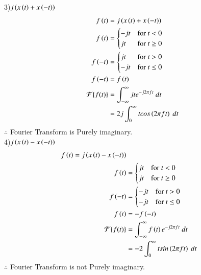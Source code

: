 \documentclass[journal,12pt,twocolumn]{IEEEtran}
\theoremstyle{remark}
\begin{document}
3)$j\left(x\left(t\right) + x\left(-t\right)\right)$
\begin{align}
  f\brak{t}&= j\brak{x\brak{t} + x\brak{-t}}\\
  f\brak{t} &= 
\begin{cases} 
-jt & \text{for } t < 0 \\
jt & \text{for } t \geq 0 
\end{cases}\\
   f\brak{-t} &= 
\begin{cases} 
jt & \text{for } t > 0 \\
-jt & \text{for } t \leq 0 
\end{cases}\\
  f\brak{-t}&=f\brak{t}\\
  \mathcal{F}\{f(t)\}&=\int_{-\infty}^{\infty} jt e^{-j 2\pi f t} \ dt\\
  &=2j\int_{0}^{\infty} t  cos\brak{2\pi ft}  \ dt
\end{align}
$\therefore$ Fourier Transform is Purely imaginary.\\
4)$j\left(x\left(t\right) - x\left(-t\right)\right)$
\begin{align}
  f\left(t\right)=j\left(x\left(t\right) - x\left(-t\right)\right)\\
  f\left(t\right) &= 
\begin{cases} 
jt & \text{for } t < 0 \\
jt & \text{for } t \geq 0 
\end{cases}\\
f\left(-t\right) &= 
\begin{cases} 
-jt & \text{for } t > 0 \\
-jt & \text{for } t \leq 0 
\end{cases}\\
f\left(t\right)&=-f\left(-t\right)\\
  \mathcal{F}\{f(t)\}&=\int_{-\infty}^{\infty} f\left(t\right) e^{-j 2\pi f t} \ dt\\
  &=-2\int_{0}^{\infty} t  sin\left(2\pi ft\right)  \ dt
\end{align}
$\therefore$ Fourier Transform is not Purely imaginary.\\
\end{document}
